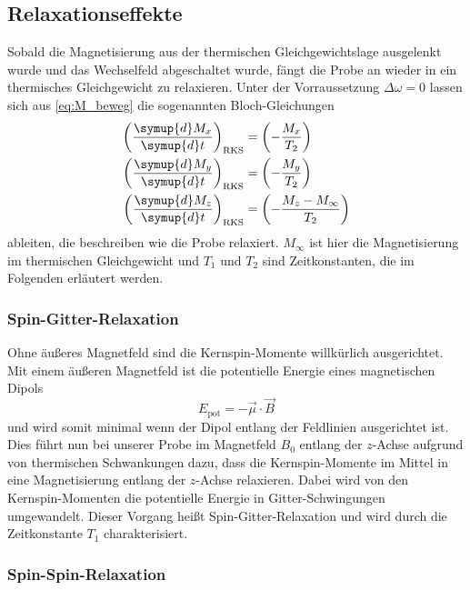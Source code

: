 \subsection{Relaxationseffekte}
\label{ssec:Relaxationseffekte}

Sobald die Magnetisierung aus der thermischen Gleichgewichtslage ausgelenkt wurde und das Wechselfeld abgeschaltet wurde,
fängt die Probe an wieder in ein thermisches Gleichgewicht zu relaxieren.
Unter der Vorraussetzung $\Delta \omega = 0$ lassen sich aus \autoref{eq:M_beweg} die sogenannten Bloch-Gleichungen 
\begin{align}
    \left( \frac{\symup{d} M_x}{\symup{d} t} \right)_\text{RKS} &= \left( -\frac{M_x}{T_2} \right)
    \label{eq:Bloch_x} \\
    \left( \frac{\symup{d} M_y}{\symup{d} t} \right)_\text{RKS} &= \left( -\frac{M_y}{T_2} \right)
    \label{eq:Bloch_y} \\
    \left( \frac{\symup{d} M_z}{\symup{d} t} \right)_\text{RKS} &= \left( -\frac{M_z - M_\infty}{T_2} \right)
    \label{eq:Bloch_z} 
\end{align}
ableiten, die beschreiben wie die Probe relaxiert.
$M_\infty$ ist hier die Magnetisierung im thermischen Gleichgewicht und $T_1$ und $T_2$ sind Zeitkonstanten, die im Folgenden erläutert werden.

\subsubsection{Spin-Gitter-Relaxation}
\label{sssec:Spin-Gitter-Relaxation}

Ohne äußeres Magnetfeld sind die Kernspin-Momente willkürlich ausgerichtet.
Mit einem äußeren Magnetfeld ist die potentielle Energie eines magnetischen Dipols
\begin{equation}
    E_\text{pot} = - \vec{\mu} \cdot \vec{B}
\end{equation}
und wird somit minimal wenn der Dipol entlang der Feldlinien ausgerichtet ist.
Dies führt nun bei unserer Probe im Magnetfeld $B_0$ entlang der $z$-Achse aufgrund von thermischen Schwankungen dazu, 
dass die Kernspin-Momente im Mittel in eine Magnetisierung entlang der $z$-Achse relaxieren.
Dabei wird von den Kernspin-Momenten die potentielle Energie in Gitter-Schwingungen umgewandelt.
Dieser Vorgang heißt Spin-Gitter-Relaxation und wird durch die Zeitkonstante $T_1$ charakterisiert.

\subsubsection{Spin-Spin-Relaxation}
\label{sssec:Spin-Spin-Relaxation}

